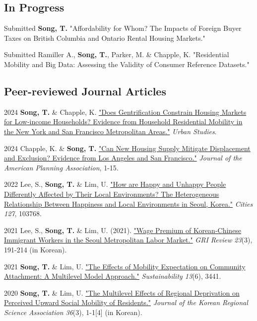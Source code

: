 \documentclass[12pt,letterpaper]{report}
\begin{document}
    \subsection*{In Progress}
    \begin{tablist}
        \item[Submitted] \tab{}\textbf{Song, T.} "Affordability for Whom? The Impacts of Foreign Buyer Taxes on British Columbia and Ontario Rental Housing Markets."
        \item[Submitted] \tab{}Ramiller A., \textbf{Song, T.}, Parker, M. \& Chapple, K. "Residential Mobility and Big Data: Assessing the Validity of Consumer Reference Datasets."
        \end{tablist}
    \subsection*{Peer-reviewed Journal Articles}
    \begin{tablist}
        \item[2024] \tab{}\textbf{Song, T.} \& Chapple, K. \href{https://doi.org/10.1177/00420980241244699}{"Does Gentrification Constrain Housing Markets for Low-income Households? Evidence from Household Residential Mobility in the New York and San Francisco Metropolitan Areas."} \emph{Urban Studies}.
        \item[2024] \tab{}Chapple, K. \& \textbf{Song, T.} \href{https://doi.org/10.1080/01944363.2024.2319293}{"Can New Housing Supply Mitigate Displacement and Exclusion? Evidence from Los Angeles and San Francisco."} \emph{Journal of the American Planning Association}, 1-15.
        \item[2022] \tab{}Lee, S., \textbf{Song, T.} \& Lim, U. \href{https://doi.org/10.1016/j.cities.2022.103768}{"How are Happy and Unhappy People Differently Affected by Their Local Environments? The Heterogeneous Relationship Between Happiness and Local Environments in Seoul, Korea."} \emph{Cities 127}, 103768.
        \item[2021] \tab{}Lee, S., \textbf{Song, T.} \& Lim, U. (2021). \href{https://www.dbpia.co.kr/Journal/articleDetail?nodeId=NODE11025769}{"Wage Premium of Korean-Chinese Immigrant Workers in the Seoul Metropolitan Labor Market."} \emph{GRI Review 23}(3), 191-214 (in Korean).
        \item[2021] \tab{}\textbf{Song, T.} \& Lim, U. \href{https://www.mdpi.com/2071-1050/13/6/3441}{"The Effects of Mobility Expectation on Community Attachment: A Multilevel Model Approach."} \emph{Sustainability 13}(6), 3441.
        \item[2020] \tab{}\textbf{Song, T.} \& Lim, U. \href{"https://www.koreascience.or.kr/article/JAKO202030161655441.page}{"The Multilevel Effects of Regional Deprivation on Perceived Upward Social Mobility of Residents."} \emph{Journal of the Korean Regional Science Association 36}(3), 1-1[4] (in Korean).
    \end{tablist}
\end{document}
